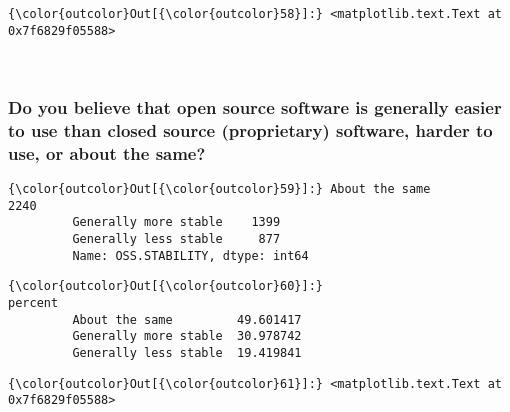 \documentclass[11pt]{article}
\begin{document}
            \begin{Verbatim}[commandchars=\\\{\}]
{\color{outcolor}Out[{\color{outcolor}58}]:} <matplotlib.text.Text at 0x7f6829f05588>
\end{Verbatim}
        
    \begin{center}
    \end{center}
    { \hspace*{\fill} \\}
    
    \subsubsection{Do you believe that open source software is generally
easier to use than closed source (proprietary) software, harder to use,
or about the
same?}\label{do-you-believe-that-open-source-software-is-generally-easier-to-use-than-closed-source-proprietary-software-harder-to-use-or-about-the-same}


            \begin{Verbatim}[commandchars=\\\{\}]
{\color{outcolor}Out[{\color{outcolor}59}]:} About the same           2240
         Generally more stable    1399
         Generally less stable     877
         Name: OSS.STABILITY, dtype: int64
\end{Verbatim}
        

            \begin{Verbatim}[commandchars=\\\{\}]
{\color{outcolor}Out[{\color{outcolor}60}]:}                          percent
         About the same         49.601417
         Generally more stable  30.978742
         Generally less stable  19.419841
\end{Verbatim}
        

            \begin{Verbatim}[commandchars=\\\{\}]
{\color{outcolor}Out[{\color{outcolor}61}]:} <matplotlib.text.Text at 0x7f6829f05588>
\end{Verbatim}
        
    \begin{center}
    \end{center}
    { \hspace*{\fill} \\}
    
\end{document}
